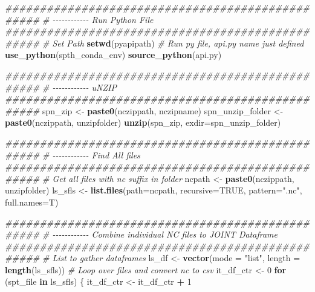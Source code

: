 \documentclass[
]{book}
\newenvironment{Shaded}{\begin{snugshade}}{\end{snugshade}}
\newcommand{\CommentTok}[1]{\textcolor[rgb]{0.56,0.35,0.01}{\textit{#1}}}
\newcommand{\ControlFlowTok}[1]{\textcolor[rgb]{0.13,0.29,0.53}{\textbf{#1}}}
\newcommand{\DataTypeTok}[1]{\textcolor[rgb]{0.13,0.29,0.53}{#1}}
\newcommand{\DecValTok}[1]{\textcolor[rgb]{0.00,0.00,0.81}{#1}}
\newcommand{\KeywordTok}[1]{\textcolor[rgb]{0.13,0.29,0.53}{\textbf{#1}}}
\newcommand{\NormalTok}[1]{#1}
\newcommand{\OperatorTok}[1]{\textcolor[rgb]{0.81,0.36,0.00}{\textbf{#1}}}
\newcommand{\OtherTok}[1]{\textcolor[rgb]{0.56,0.35,0.01}{#1}}
\newcommand{\StringTok}[1]{\textcolor[rgb]{0.31,0.60,0.02}{#1}}
\begin{document}
\begin{Shaded}
\begin{Highlighting}[]
    \CommentTok{\#\#\#\#\#\#\#\#\#\#\#\#\#\#\#\#\#\#\#\#\#\#\#\#\#\#\#\#\#\#\#\#\#\#\#\#\#\#\#\#\#\#\#\#\#\#\#\#\#}
    \CommentTok{\# {-}{-}{-}{-}{-}{-}{-}{-}{-}{-}{-}{-} Run Python File}
    \CommentTok{\#\#\#\#\#\#\#\#\#\#\#\#\#\#\#\#\#\#\#\#\#\#\#\#\#\#\#\#\#\#\#\#\#\#\#\#\#\#\#\#\#\#\#\#\#\#\#\#\#}
    \CommentTok{\# Set Path}
    \KeywordTok{setwd}\NormalTok{(pyapipath)}
    \CommentTok{\# Run py file, api.py name just defined}
    \KeywordTok{use\_python}\NormalTok{(spth\_conda\_env)}
    \KeywordTok{source\_python}\NormalTok{(}\StringTok{\textquotesingle{}api.py\textquotesingle{}}\NormalTok{)}

    \CommentTok{\#\#\#\#\#\#\#\#\#\#\#\#\#\#\#\#\#\#\#\#\#\#\#\#\#\#\#\#\#\#\#\#\#\#\#\#\#\#\#\#\#\#\#\#\#\#\#\#\#}
    \CommentTok{\# {-}{-}{-}{-}{-}{-}{-}{-}{-}{-}{-}{-} uNZIP}
    \CommentTok{\#\#\#\#\#\#\#\#\#\#\#\#\#\#\#\#\#\#\#\#\#\#\#\#\#\#\#\#\#\#\#\#\#\#\#\#\#\#\#\#\#\#\#\#\#\#\#\#\#}
\NormalTok{    spn\_zip \textless{}{-}}\StringTok{ }\KeywordTok{paste0}\NormalTok{(nczippath, nczipname)}
\NormalTok{    spn\_unzip\_folder \textless{}{-}}\StringTok{ }\KeywordTok{paste0}\NormalTok{(nczippath, unzipfolder)}
    \KeywordTok{unzip}\NormalTok{(spn\_zip, }\DataTypeTok{exdir=}\NormalTok{spn\_unzip\_folder)}

    \CommentTok{\#\#\#\#\#\#\#\#\#\#\#\#\#\#\#\#\#\#\#\#\#\#\#\#\#\#\#\#\#\#\#\#\#\#\#\#\#\#\#\#\#\#\#\#\#\#\#\#\#}
    \CommentTok{\# {-}{-}{-}{-}{-}{-}{-}{-}{-}{-}{-}{-} Find All files}
    \CommentTok{\#\#\#\#\#\#\#\#\#\#\#\#\#\#\#\#\#\#\#\#\#\#\#\#\#\#\#\#\#\#\#\#\#\#\#\#\#\#\#\#\#\#\#\#\#\#\#\#\#}
    \CommentTok{\# Get all files with nc suffix in folder}
\NormalTok{    ncpath \textless{}{-}}\StringTok{ }\KeywordTok{paste0}\NormalTok{(nczippath, unzipfolder)}
\NormalTok{    ls\_sfls \textless{}{-}}\StringTok{ }\KeywordTok{list.files}\NormalTok{(}\DataTypeTok{path=}\NormalTok{ncpath, }\DataTypeTok{recursive=}\OtherTok{TRUE}\NormalTok{, }\DataTypeTok{pattern=}\StringTok{".nc"}\NormalTok{, }\DataTypeTok{full.names=}\NormalTok{T)}

    \CommentTok{\#\#\#\#\#\#\#\#\#\#\#\#\#\#\#\#\#\#\#\#\#\#\#\#\#\#\#\#\#\#\#\#\#\#\#\#\#\#\#\#\#\#\#\#\#\#\#\#\#}
    \CommentTok{\# {-}{-}{-}{-}{-}{-}{-}{-}{-}{-}{-}{-} Combine individual NC files to JOINT Dataframe}
    \CommentTok{\#\#\#\#\#\#\#\#\#\#\#\#\#\#\#\#\#\#\#\#\#\#\#\#\#\#\#\#\#\#\#\#\#\#\#\#\#\#\#\#\#\#\#\#\#\#\#\#\#}
    \CommentTok{\# List to gather dataframes}
\NormalTok{    ls\_df \textless{}{-}}\StringTok{ }\KeywordTok{vector}\NormalTok{(}\DataTypeTok{mode =} \StringTok{"list"}\NormalTok{, }\DataTypeTok{length =} \KeywordTok{length}\NormalTok{(ls\_sfls))}
    \CommentTok{\# Loop over files and convert nc to csv}
\NormalTok{    it\_df\_ctr \textless{}{-}}\StringTok{ }\DecValTok{0}
    \ControlFlowTok{for}\NormalTok{ (spt\_file }\ControlFlowTok{in}\NormalTok{ ls\_sfls) \{}
\NormalTok{      it\_df\_ctr \textless{}{-}}\StringTok{ }\NormalTok{it\_df\_ctr }\OperatorTok{+}\StringTok{ }\DecValTok{1}


\end{Highlighting}
\end{Shaded}
\end{document}
